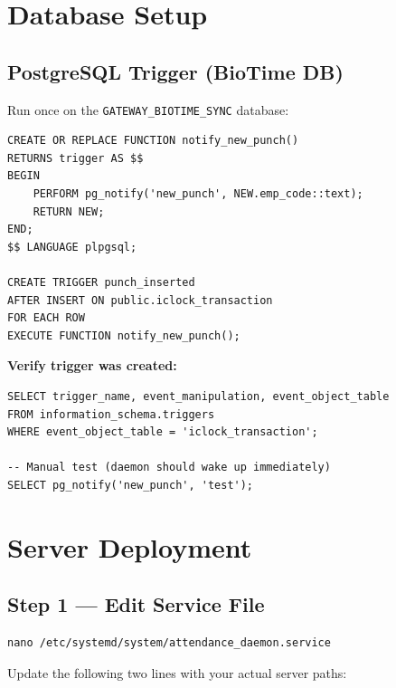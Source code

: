 \documentclass[12pt,a4paper]{article}
\begin{document}
\section{Database Setup}

\subsection{PostgreSQL Trigger (BioTime DB)}

Run once on the \texttt{GATEWAY\_BIOTIME\_SYNC} database:

\begin{lstlisting}[style=sqlstyle, caption={Create notify trigger on iclock\_transaction}]
CREATE OR REPLACE FUNCTION notify_new_punch()
RETURNS trigger AS $$
BEGIN
    PERFORM pg_notify('new_punch', NEW.emp_code::text);
    RETURN NEW;
END;
$$ LANGUAGE plpgsql;

CREATE TRIGGER punch_inserted
AFTER INSERT ON public.iclock_transaction
FOR EACH ROW
EXECUTE FUNCTION notify_new_punch();
\end{lstlisting}

\textbf{Verify trigger was created:}

\begin{lstlisting}[style=sqlstyle, caption={Verify trigger}]
SELECT trigger_name, event_manipulation, event_object_table
FROM information_schema.triggers
WHERE event_object_table = 'iclock_transaction';

-- Manual test (daemon should wake up immediately)
SELECT pg_notify('new_punch', 'test');
\end{lstlisting}

\section{Server Deployment}

\subsection{Step 1 — Edit Service File}

\begin{lstlisting}[style=bashstyle, caption={Edit paths in service file}]
nano /etc/systemd/system/attendance_daemon.service
\end{lstlisting}

Update the following two lines with your actual server paths:
\end{document}
